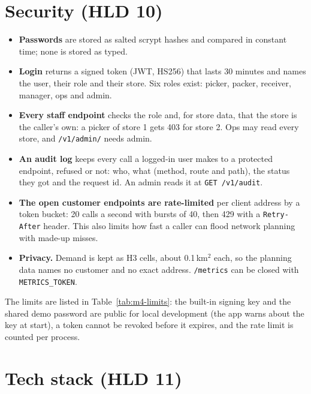 \section{Security (HLD 10)}
\label{sec:m4-security}

\begin{itemize}
  \item \textbf{Passwords} are stored as salted scrypt hashes and compared in constant time; none is stored as typed.
  \item \textbf{Login} returns a signed token (JWT, HS256) that lasts 30 minutes and names the user, their role and
    their store. Six roles exist: picker, packer, receiver, manager, ops and admin.
  \item \textbf{Every staff endpoint} checks the role and, for store data, that the store is the caller's own:
    a picker of store 1 gets 403 for store 2. Ops may read every store, and \texttt{/v1/admin/} needs admin.
  \item \textbf{An audit log} keeps every call a logged-in user makes to a protected endpoint, refused or not: who,
    what (method, route and path), the status they got and the request id. An admin reads it at
    \texttt{GET /v1/audit}.
  \item \textbf{The open customer endpoints are rate-limited} per client address by a token bucket: 20 calls a second
    with bursts of 40, then 429 with a \texttt{Retry-After} header. This also limits how fast a caller can flood
    network planning with made-up misses.
  \item \textbf{Privacy.} Demand is kept as H3 cells, about 0.1\,km$^2$ each, so the planning data names no customer
    and no exact address. \texttt{/metrics} can be closed with \texttt{METRICS\_TOKEN}.
\end{itemize}
The limits are listed in Table~\ref{tab:m4-limits}: the built-in signing key and the shared demo password are public
for local development (the app warns about the key at start), a token cannot be revoked before it expires, and the
rate limit is
counted per process.

\section{Tech stack (HLD 11)}

